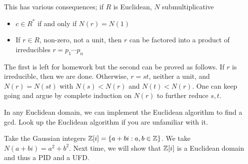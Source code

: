 \documentclass{../mathnotes}
\begin{document}
This has various consequences; if $R$ is Euclidean, $N$ submultiplicative
\begin{itemize}
    \item $c\in R^*$ if and only if $N(r)=N(1)$
    \item If $r\in R$, non-zero, not a unit, then $r$ can be factored into a product of irreducibles $r=p_1\cdots p_n$
\end{itemize}
The first is left for homework but the second can be proved as follows. If $r$ is irreducible, then we are done. Otherwise,
$r=st$, neither a unit, and $N(r)=N(st)$ with $N(s)<N(r)$ and $N(t)<N(r)$. One can keep going and argue by complete induction
on $N(r)$ to further reduce $s,t$.

\begin{rem}
    In any Euclidean domain, we can implement the Euclidean algorithm to find a gcd. Look up the Euclidean algorithm if
    you are unfamiliar with it.
\end{rem}

\begin{exmp}
    Take the Gaussian integers $\mathbb{Z}[i]=\left\{ a+bi:a,b\in\mathbb{Z} \right\}$. We take $N(a+bi)=a^2+b^2$. Next time, we will show
    that $\mathbb{Z}[i]$ is a Euclidean domain and thus a PID and a UFD.
\end{exmp}
\end{document}

